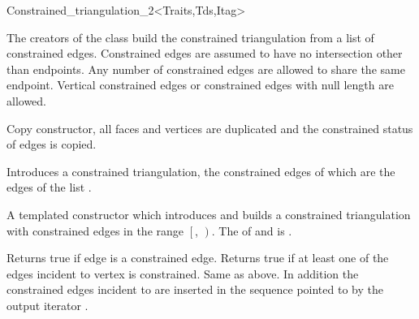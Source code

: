 \begin{ccRefClass}{Constrained_triangulation_2<Traits,Tds,Itag>}
 
\ccInheritsFrom


\ccTypes
{}



\ccCreation
{}  %
The creators of the class build the constrained triangulation from a
list of constrained edges. Constrained edges are assumed to have no
intersection other than endpoints. Any number of constrained edges are
allowed to share the same endpoint.  Vertical constrained edges or
constrained edges with null length are allowed.

 {Copy constructor, all faces and vertices
are duplicated and  the constrained status of edges
is copied.}

{Introduces a constrained triangulation, the constrained edges of which
are the edges of the list .}

{A templated constructor which introduces and builds
 a constrained triangulation with constrained edges in the range 
$\left[\right.$, $\left.\right)$.
\ccPrecond The  of  and 
 is .}

{Returns true if edge  is a constrained edge.}
{Returns true if at least one of the edges incident to vertex 
is constrained.}
{Same as above. In addition the constrained edges incident to 
are inserted in the sequence pointed to by the output iterator .}



\end{ccRefClass}
